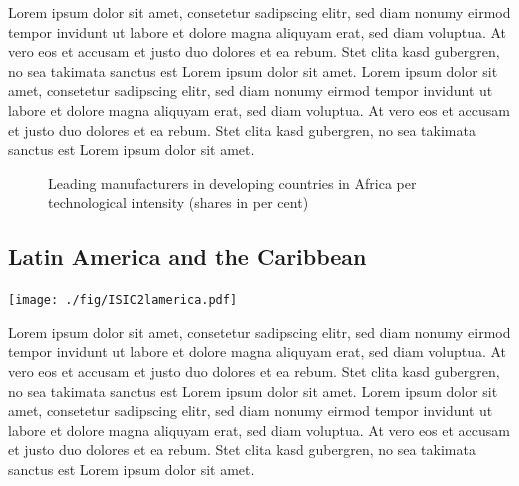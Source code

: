 \documentclass[
  openany, nofonts]{tufte-book}
\begin{document}
Lorem ipsum dolor sit amet, consetetur sadipscing elitr, sed diam nonumy eirmod tempor invidunt ut labore et dolore magna aliquyam erat, sed diam voluptua. At vero eos et accusam et justo duo dolores et ea rebum. Stet clita kasd gubergren, no sea takimata sanctus est Lorem ipsum dolor sit amet. Lorem ipsum dolor sit amet, consetetur sadipscing elitr, sed diam nonumy eirmod tempor invidunt ut labore et dolore magna aliquyam erat, sed diam voluptua. At vero eos et accusam et justo duo dolores et ea rebum. Stet clita kasd gubergren, no sea takimata sanctus est Lorem ipsum dolor sit amet.

\vspace*{\fill}

\begin{figure}
\newline{}\caption[Leading manufacturers in developing countries in Africa per technological intensity (shares in per cent)]{Leading manufacturers in developing countries in Africa per technological intensity (shares in per cent)}\label{fig:c05-indshareDEVsub1slope}
\end{figure}

\clearpage\pagebreak

\hypertarget{latin-america-and-the-caribbean}{%
\subsection{Latin America and the Caribbean}\label{latin-america-and-the-caribbean}}

\begin{marginfigure}
\texttt{[image: ./fig/ISIC2lamerica.pdf]} \end{marginfigure}

Lorem ipsum dolor sit amet, consetetur sadipscing elitr, sed diam nonumy eirmod tempor invidunt ut labore et dolore magna aliquyam erat, sed diam voluptua. At vero eos et accusam et justo duo dolores et ea rebum. Stet clita kasd gubergren, no sea takimata sanctus est Lorem ipsum dolor sit amet. Lorem ipsum dolor sit amet, consetetur sadipscing elitr, sed diam nonumy eirmod tempor invidunt ut labore et dolore magna aliquyam erat, sed diam voluptua. At vero eos et accusam et justo duo dolores et ea rebum. Stet clita kasd gubergren, no sea takimata sanctus est Lorem ipsum dolor sit amet.
\end{document}
